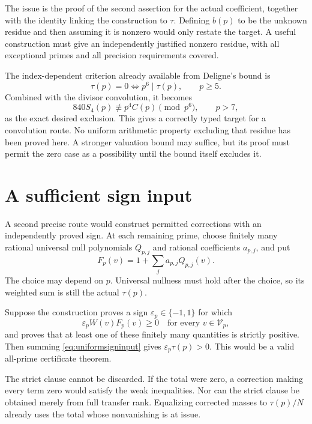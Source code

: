 The issue is the proof of the second assertion for the actual coefficient, together with the identity linking the construction to $\tau$. Defining $b(p)$ to be the unknown residue and then assuming it is nonzero would only restate the target. A useful construction must give an independently justified nonzero residue, with all exceptional primes and all precision requirements covered.

The index-dependent criterion already available from Deligne's bound is
\[
\tau(p)=0\iff p^6\mid\tau(p),\qquad p\ge5.
\]
Combined with the divisor convolution, it becomes
\begin{equation}\label{eq:closeoutconvolution}
840S_4(p)\not\equiv p^4C(p)\pmod{p^6},
\qquad p>7,
\end{equation}
as the exact desired exclusion. This gives a correctly typed target for a convolution route. No uniform arithmetic property excluding that residue has been proved here. A stronger valuation bound may suffice, but its proof must permit the zero case as a possibility until the bound itself excludes it.

\section{A sufficient sign input}
A second precise route would construct permitted corrections with an independently proved sign. At each remaining prime, choose finitely many rational universal null polynomials $Q_{p,j}$ and rational coefficients $a_{p,j}$, and put
\[
F_p(v)=1+\sum_j a_{p,j}Q_{p,j}(v).
\]
The choice may depend on $p$. Universal nullness must hold after the choice, so its weighted sum is still the actual $\tau(p)$.

Suppose the construction proves a sign $\varepsilon_p\in\{-1,1\}$ for which
\begin{equation}\label{eq:uniformsigninput}
\varepsilon_p W(v)F_p(v)\ge0
\quad\text{for every }v\in\mathcal V_p,
\end{equation}
and proves that at least one of these finitely many quantities is strictly positive. Then summing \eqref{eq:uniformsigninput} gives $\varepsilon_p\tau(p)>0$. This would be a valid all-prime certificate theorem.

The strict clause cannot be discarded. If the total were zero, a correction making every term zero would satisfy the weak inequalities. Nor can the strict clause be obtained merely from full transfer rank. Equalizing corrected masses to $\tau(p)/N$ already uses the total whose nonvanishing is at issue.

